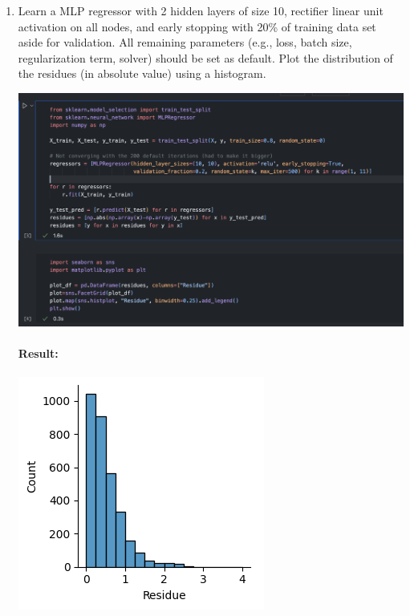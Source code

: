 \documentclass[12pt]{article}
\begin{document}
\begin{enumerate}
    \item Learn a MLP regressor with 2 hidden layers of size 10, rectifier linear unit activation
    on all nodes, and early stopping with 20\% of training data set aside for validation. All
    remaining parameters (e.g., loss, batch size, regularization term, solver) should be set as
    default. Plot the distribution of the residues (in absolute value) using a histogram.

    \begin{center}
        \includegraphics[scale=0.5]{images/code7.png}
    \end{center}
    \vskip 6cm
    \paragraph{Result:}

    \begin{center}
        \includegraphics[scale=0.9]{images/graph1.png}
    \end{center}


\end{enumerate}
\end{document}

